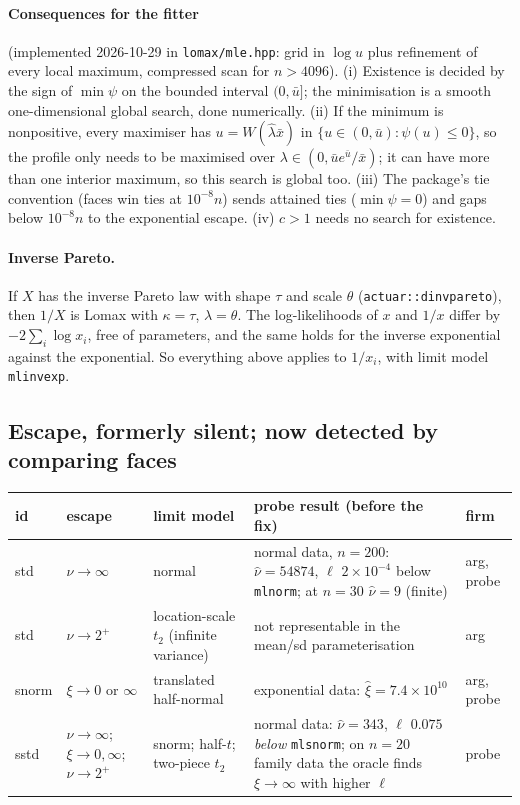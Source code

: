 \documentclass[11pt]{article}
\newcommand{\code}[1]{\texttt{#1}}
\theoremstyle{plain}
\theoremstyle{definition}
\theoremstyle{remark}
\begin{document}
\paragraph{Consequences for the fitter} (implemented 2026-10-29 in
\code{lomax/mle.hpp}: grid in $\log u$ plus refinement of every local
maximum, compressed scan for $n>4096$). (i) Existence is decided by the sign
of $\min\psi$ on the bounded interval $(0,\bar u]$; the minimisation is a
smooth one-dimensional global search, done numerically. (ii) If the minimum
is nonpositive, every maximiser has $u = W(\hat\lambda\bar x)$ in
$\{u\in(0,\bar u):\psi(u)\le0\}$, so the profile only needs to be maximised
over $\lambda\in(0,\bar u e^{\bar u}/\bar x)$; it can have more than one
interior maximum, so this search is global too. (iii) The package's tie
convention (faces win ties at $10^{-8}n$) sends attained ties ($\min\psi = 0$)
and gaps below $10^{-8}n$ to the exponential escape. (iv) $c>1$ needs no search for existence.

\paragraph{Inverse Pareto.} If $X$ has the inverse Pareto law with shape
$\tau$ and scale $\theta$ (\code{actuar::dinvpareto}), then $1/X$ is Lomax
with $\kappa=\tau$, $\lambda=\theta$. The log-likelihoods of $x$ and $1/x$
differ by $-2\sum_i\log x_i$, free of parameters, and the same holds for the
inverse exponential against the exponential. So everything above applies to
$1/x_i$, with limit model \code{mlinvexp}.

\subsection{Escape, formerly silent; now detected by comparing faces}

\begin{center}
\small
\begin{tabular}{@{}l p{3.4cm} p{3.2cm} p{5.4cm} l@{}}
\toprule
id & escape & limit model & probe result (before the fix) & firm \\
\midrule
std & $\nu\to\infty$ & normal &
  normal data, $n=200$: $\hat\nu = 54874$, $\ell$ $2\times10^{-4}$ below
  \code{mlnorm}; at $n=30$ $\hat\nu = 9$ (finite) & arg, probe \\
std & $\nu\to 2^+$ & location-scale $t_2$ (infinite variance) &
  not representable in the mean/sd parameterisation & arg \\
snorm & $\xi\to 0$ or $\infty$ & translated half-normal &
  exponential data: $\hat\xi = 7.4\times10^{10}$ & arg, probe \\
sstd & $\nu\to\infty$; $\xi\to0,\infty$; $\nu\to2^+$ & snorm; half-$t$; two-piece $t_2$ &
  normal data: $\hat\nu = 343$, $\ell$ $0.075$ \emph{below} \code{mlsnorm};
  on $n=20$ family data the oracle finds $\xi\to\infty$ with higher $\ell$ & probe \\
\bottomrule
\end{tabular}
\end{center}
\end{document}
